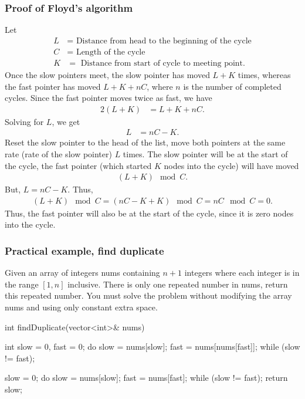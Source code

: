 \documentclass{report}
\begin{document}
    \subsubsection{Proof of Floyd's algorithm}
    \bigbreak \noindent 
    Let
    \begin{align*}
        L &= \text{ Distance from head to the beginning of the cycle}\\
        C &= \text{ Length of the cycle} \\
        K &= \text{ Distance from start of cycle to meeting point}
    .\end{align*}
    \bigbreak \noindent 
    Once the slow pointers meet, the slow pointer has moved $L + K$ times, whereas the fast pointer has moved $L + K +nC$, where $n$ is the number of completed cycles. Since the fast pointer moves twice as fast, we have
    \begin{align*}
        2(L + K) &= L + K + nC
    .\end{align*}
    Solving for $L$, we get
    \begin{align*}
        L &= nC - K
    .\end{align*}
    Reset the slow pointer to the head of the list, move both pointers at the same rate (rate of the slow pointer) $L$ times. The slow pointer will be at the start of the cycle, the fast pointer (which started $K$ nodes into the cycle) will have moved 
    \begin{align*}
        (L + K) \mod C
    .\end{align*}
    But, $L = nC - K$. Thus,
    \begin{align*}
        (L + K) \mod C = (nC - K + K) \mod C = nC \mod C = 0
    .\end{align*}
    Thus, the fast pointer will also be at the start of the cycle, since it is zero nodes into the cycle. \endpf

    \bigbreak \noindent 
    \subsubsection{Practical example, find duplicate}
    \bigbreak \noindent 
    Given an array of integers nums containing $n + 1$ integers where each integer is in the range $[1, n]$ inclusive.
    \bigbreak \noindent 
    There is only one repeated number in nums, return this repeated number.
    \bigbreak \noindent 
    You must solve the problem without modifying the array nums and using only constant extra space.

    \bigbreak \noindent 
    \begin{cppcode}
        int findDuplicate(vector<int>& nums) {
            int slow = 0, fast = 0;
            do {
                slow = nums[slow];
                fast = nums[nums[fast]];
            } while (slow != fast);

            slow = 0;
            do {
                slow = nums[slow];
                fast = nums[fast];
            } while (slow != fast);
            return slow;
        }
    \end{cppcode}
\end{document}
